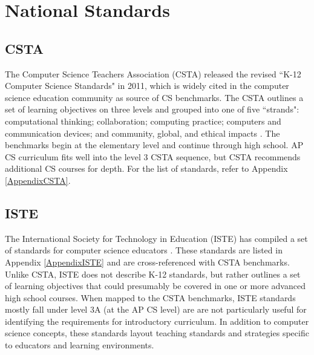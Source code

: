 \section{National Standards}
\subsection{CSTA}
The Computer Science Teachers Association (CSTA) released the revised ``K-12 Computer Science Standards" in 2011, which is widely cited in the computer science education community as source of CS benchmarks. The CSTA outlines a set of learning objectives on three levels and grouped into one of five ``strands": computational thinking; collaboration; computing practice; computers and communication devices; and community, global, and ethical impacts \cite{csta}. The benchmarks begin at the elementary level and continue through high school. AP CS curriculum fits well into the level 3 CSTA sequence, but CSTA recommends additional CS courses for depth. For the list of standards, refer to Appendix \ref{AppendixCSTA}.\par
\subsection{ISTE}
The International Society for Technology in Education (ISTE) has compiled a set of standards for computer science educators \cite{iste}. These standards are listed in Appendix \ref{AppendixISTE} and are cross-referenced with CSTA benchmarks. Unlike CSTA, ISTE does not describe K-12 standards, but rather outlines a set of learning objectives that could presumably be covered in one or more advanced high school courses. When mapped to the CSTA benchmarks, ISTE standards mostly fall under level 3A (at the AP CS level) are are not particularly useful for identifying the requirements for introductory curriculum. In addition to computer science concepts, these standards layout teaching standards and strategies specific to educators and learning environments. \par
